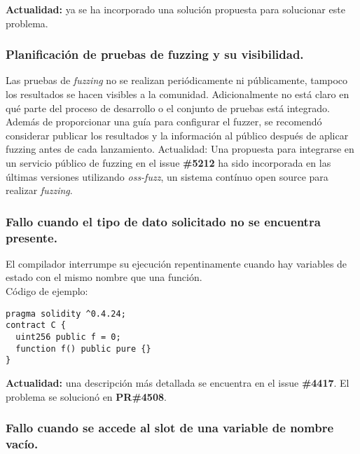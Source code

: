 \textbf{Actualidad:} ya se ha incorporado una solución propuesta\cite{GHPR4434} para solucionar este problema.\\

\subsubsection{Planificación de pruebas de fuzzing y su visibilidad.}

Las pruebas de \textit{fuzzing} no se realizan periódicamente ni públicamente, tampoco los resultados se hacen visibles a la comunidad. Adicionalmente no está claro en qué parte del proceso de desarrollo o el conjunto de pruebas está integrado.\\

Además de proporcionar una guía para configurar el fuzzer, se recomendó considerar publicar los resultados y la información al público después de aplicar fuzzing antes de cada lanzamiento.
Actualidad: Una propuesta para integrarse en un servicio público de fuzzing en el issue \textbf{\#5212}\cite{GHI5212} ha sido incorporada en las últimas versiones utilizando \textit{oss-fuzz}, un sistema contínuo open source para realizar \textit{fuzzing}.\\

\subsubsection{Fallo cuando el tipo de dato solicitado no se encuentra presente.}

El compilador interrumpe su ejecución repentinamente cuando hay variables de estado con el mismo nombre que una función.\\

Código de ejemplo:
\begin{lstlisting}[language=Solidity]
pragma solidity ^0.4.24;
contract C {
  uint256 public f = 0;
  function f() public pure {}
}
\end{lstlisting}

\textbf{Actualidad:} una descripción más detallada se encuentra en el issue \textbf{\#4417}\cite{GHI4417}. El problema se solucionó en \textbf{PR\#4508}\cite{GHPR4508}.\\

\subsubsection{Fallo cuando se accede al slot de una variable de nombre vacío.}

